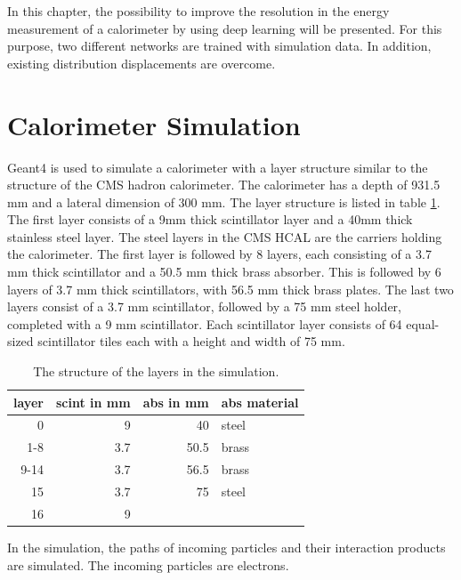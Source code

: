 \documentclass[12pt, a4paper]{thesis}
\begin{document}
In this chapter, the possibility to improve the resolution in the
energy measurement of a calorimeter by using deep learning will be
presented. For this purpose, two different networks are trained with
simulation data. In addition, existing distribution displacements are
overcome.


\section{Calorimeter Simulation}
\label{sec:org905cdeb}

Geant4 \cite{geant_simul_toolkit} is used to simulate a calorimeter
with a layer structure similar to the structure of the CMS hadron
calorimeter. The calorimeter has a depth of 931.5 mm and a lateral
dimension of 300 mm. The layer structure is listed in table
\ref{fcn_structure}. The first layer consists of a 9mm thick
scintillator layer and a 40mm thick stainless steel layer. The steel
layers in the CMS HCAL are the carriers holding the calorimeter. The
first layer is followed by 8 layers, each consisting of a 3.7 mm thick
scintillator and a 50.5 mm thick brass absorber. This is followed by 6
layers of 3.7 mm thick scintillators, with 56.5 mm thick brass plates.
The last two layers consist of a 3.7 mm scintillator, followed by a 75
mm steel holder, completed with a 9 mm scintillator. Each scintillator
layer consists of 64 equal-sized scintillator tiles each with a height
and width of 75 mm.

\begin{table}[htbp]
  \centering
  \begin{tabular}{rrrl}
    layer & scint in mm & abs in mm & abs material\\
    \hline
    0 & 9 & 40 & steel\\
    1-8 & 3.7 & 50.5 & brass\\
    9-14 & 3.7 & 56.5 & brass\\
    15 & 3.7 & 75 & steel\\
    16 & 9 &  & \\
  \end{tabular}
  \caption{The structure of the layers in the simulation.}
  \label{fcn_structure}
\end{table}

In the simulation, the paths of incoming particles and their
interaction products are simulated. The incoming particles are
electrons.
\end{document}
